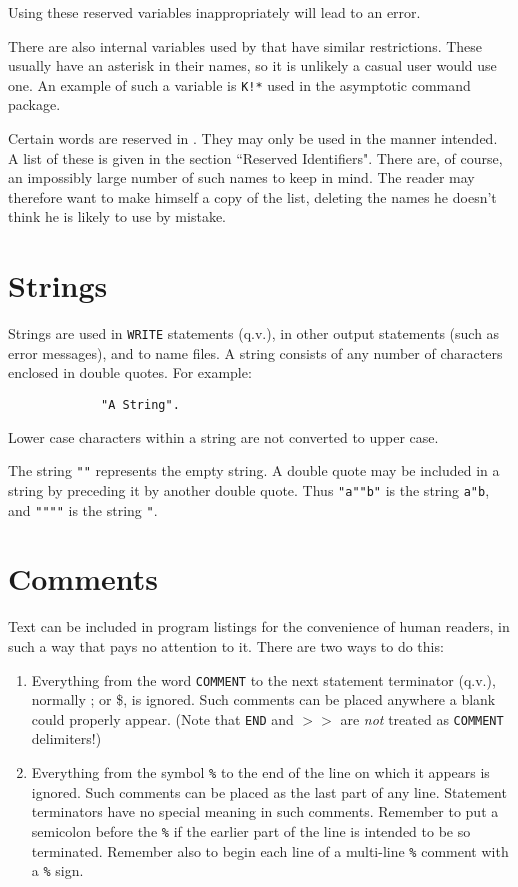 Using these reserved variables inappropriately
will lead to an error.

There are also internal variables used by {\REDUCE} that have similar
restrictions. These usually have an asterisk in their names, so it is
unlikely a casual user would use one. An example of such a variable is
{\tt K!*} used in the asymptotic command package.

Certain words are reserved in {\REDUCE}. They may only be used in the manner
intended. A list of these is given in the section ``Reserved Identifiers".
There are, of course, an impossibly large number of such names to keep in
mind. The reader may therefore want to make himself a copy of the list,
deleting the names he doesn't think he is likely to use by mistake.

\section{Strings}

Strings are used in {\tt WRITE} statements (q.v.), in other
output statements (such as error messages), and to name files.  A string
consists of any number of characters enclosed in double quotes.  For example:
\begin{verbatim}
             "A String".
\end{verbatim}
Lower case characters within a string are not converted to upper case.

The string {\tt ""} represents the empty string.  A double quote may be
included in a string by preceding it by another double quote.  Thus
{\tt "a""b"} is the string {\tt a"b}, and {\tt """"} is the string {\tt "}.

\section{Comments}

Text can be included in program listings for the
convenience of human readers, in such a way that {\REDUCE} pays no
attention to it.  There are two ways to do this:

\begin{enumerate}
\item Everything from the word {\tt COMMENT} to the next
statement terminator (q.v.), normally ; or \$, is ignored.  Such comments
can be placed anywhere a blank could properly appear. (Note that {\tt END}
and $>>$ are {\em not} treated as {\tt COMMENT} delimiters!)

\item Everything from the symbol {\tt \%} to the end
of the line on which it appears is ignored.  Such comments can be placed
as the last part of any line.  Statement terminators have no special
meaning in such comments.  Remember to put a semicolon before the {\tt \%}
if the earlier part of the line is intended to be so terminated.  Remember
also to begin each line of a multi-line {\tt \%} comment with a {\tt \%}
sign.
\end{enumerate}

